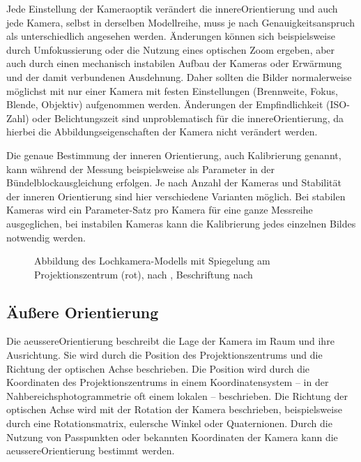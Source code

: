 \documentclass[./00PhotoBox.tex]{subfiles}
\begin{document}
Jede Einstellung der Kameraoptik verändert die \gls{innereOrientierung} und auch jede Kamera, selbst in derselben Modellreihe, muss je nach Genauigkeitsanspruch als unterschiedlich angesehen werden. Änderungen können sich beispielsweise durch Umfokussierung oder die Nutzung eines optischen Zoom ergeben, aber auch durch einen mechanisch instabilen Aufbau der Kameras oder Erwärmung und der damit verbundenen Ausdehnung. Daher sollten die Bilder normalerweise möglichst mit nur einer Kamera mit festen Einstellungen (Brennweite, Fokus, Blende, Objektiv) aufgenommen werden. Änderungen der Empfindlichkeit (ISO-Zahl) oder Belichtungszeit sind unproblematisch für die \gls{innereOrientierung}, da hierbei die Abbildungseigenschaften der Kamera nicht verändert werden. \citep[S. 176]{luhmann}

Die genaue Bestimmung der inneren Orientierung, auch Kalibrierung genannt, kann wäh\-rend der Messung beispielsweise als Parameter in der Bündel\-block\-ausgleichung erfolgen. Je nach Anzahl der Kameras und Stabilität der inneren Orientierung sind hier verschiedene Varianten möglich. Bei stabilen Kameras wird ein Parameter-Satz pro Kamera für eine ganze Messreihe ausgeglichen, bei instabilen Kameras kann die Kalibrierung jedes einzelnen Bildes notwendig werden. \citep[S. 181f]{luhmann}

\begin{figure}
    \centering
    
    \caption{Abbildung des Lochkamera-Modells mit Spiegelung am Projektionszentrum (rot), nach \citealt[S. 154]{hartley}, Beschriftung nach \citealt{luhmann}} %
    \label{img:optische_achse}
\end{figure}


\subsection{Äußere Orientierung}
\label{s:aeussereorientierung}
Die \gls{aeussereOrientierung} beschreibt die Lage der Kamera im Raum und ihre Ausrichtung. Sie wird durch die Position des Projektionszentrums und die Richtung der optischen Achse beschrieben. Die Position wird durch die Koordinaten des Projektionszentrums in einem Koordinatensystem -- in der Nahbereichsphotogrammetrie oft einem lokalen -- beschrieben. Die Richtung der optischen Achse wird mit der Rotation der Kamera beschrieben, beispielsweise durch eine Rotationsmatrix, eulersche Winkel oder Quaternionen. Durch die Nutzung von Passpunkten oder bekannten Koordinaten der Kamera kann die \gls{aeussereOrientierung} bestimmt werden. \citep[S. 273ff]{luhmann}
\end{document}
